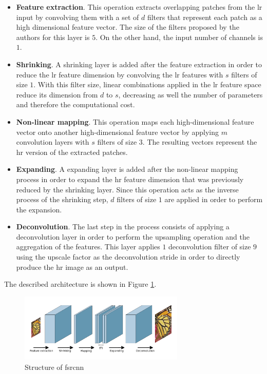 \begin{itemize}
	\item \textbf{Feature extraction}. This operation extracts overlapping patches from the \gls{lr} input by convolving them with a set of $d$ filters that represent each patch as a high dimensional feature vector. The size of the filters proposed by the authors for this layer is $5$. On the other hand, the input number of channels is $1$.
	
	\item \textbf{Shrinking}. A shrinking layer is added after the feature extraction in order to reduce the \gls{lr} feature dimension by convolving the \gls{lr} features with $s$ filters of size $1$. With this filter size, linear combinations applied in the  \gls{lr} feature space reduce its dimension from $d$ to $s$, decreasing as well the number of parameters and therefore the computational cost.
	
	\item \textbf{Non-linear mapping}. This operation maps each high-dimensional feature vector onto another high-dimensional feature vector by applying $m$ convolution layers with $s$ filters of size $3$. The resulting vectors represent the \gls{hr} version of the extracted patches.
	
	\item \textbf{Expanding}. A expanding layer is added after the non-linear mapping process in order to expand the \gls{hr} feature dimension that was previously reduced by the shrinking layer. Since this operation acts as the inverse process of the shrinking step, $d$ filters of size $1$ are applied in order to perform the expansion.
	
	\item \textbf{Deconvolution}. The last step in the process consists of applying a deconvolution layer in order to perform the upsampling operation and the aggregation of the features. This layer applies $1$ deconvolution filter of size $9$ using the upscale factor as the deconvolution stride in order to directly produce the \gls{hr} image as an output.
\end{itemize}

The described architecture is shown in Figure \ref{fig:fsrcnn}.

\begin{figure}
	\centering
	\includegraphics[width=0.7\textwidth]{images/fsrcnn.png}
	\caption{Structure of \gls{fsrcnn}}
	\label{fig:fsrcnn}
\end{figure}

